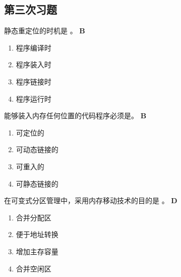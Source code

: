 \subsection*{第三次习题}
\setcounter{problemname}{0}

\begin{problem}
	静态重定位的时机是 \myline。
	\textbf{B}
	\vspace{-0.5em}
	\begin{multicols}{4}
		\begin{enumerate}[label=\Alph*.]
			\item 程序编译时
			\item 程序装入时
			\item 程序链接时
			\item 程序运行时
		\end{enumerate}
	\end{multicols}
	\vspace{-1em}
\end{problem}


\begin{problem}
	‌能够装入内存任何位置的代码程序必须是\myline。
	\textbf{B}
	\vspace{-0.5em}
	\begin{multicols}{4}
		\begin{enumerate}[label=\Alph*.]
			\item 可定位的
			\item 可动态链接的
			\item 可重入的
			\item 可静态链接的
		\end{enumerate}
	\end{multicols}
	\vspace{-1em}
\end{problem}


\begin{problem}
	在可变式分区管理中，采用内存移动技术的目的是 \myline。
	\textbf{D}
	\vspace{-0.5em}
	\begin{multicols}{4}
		\begin{enumerate}[label=\Alph*.]
			\item 合并分配区
			\item 便于地址转换
			\item 增加主存容量
			\item 合并空闲区
		\end{enumerate}
	\end{multicols}
	\vspace{-1em}
\end{problem}


